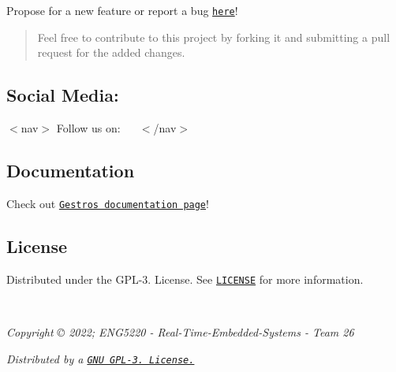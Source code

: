 Propose for a new feature or report a bug \href{https://github.com/RandomGuy-coder/Gestro/issues}{\tt here}!

\begin{quote}
Feel free to contribute to this project by forking it and submitting a pull request for the added changes. \end{quote}


\subsection*{Social Media\+:}

$<$nav$>$ Follow us on\+:~\newline
~\newline
  \href{https://www.facebook.com/GestroProject}{\tt } \href{https://twitter.com/GestroProject}{\tt } \href{https://www.instagram.com/gestroproject/}{\tt } \href{https://hackaday.io/project/184728-gestro}{\tt }  $<$/nav$>$

\subsection*{Documentation}

Check out \href{https://randomguy-coder.github.io/Gestro/docs/html/index.html}{\tt Gestro\textquotesingle{}s documentation page}!

\subsection*{License}

Distributed under the G\+P\+L-\/3. License. See \href{https://github.com/RandomGuy-coder/Gestro/blob/main/LICENSE}{\tt {\ttfamily L\+I\+C\+E\+N\+SE}} for more information.

~\newline
 
\footnotesize {\itshape Copyright \copyright{} 2022; E\+N\+G5220 -\/ Real-\/\+Time-\/\+Embedded-\/\+Systems -\/ Team 26}
\normalsize ~\newline
 
\footnotesize {\itshape Distributed by a \href{https://github.com/RandomGuy-coder/Gestro/blob/main/LICENSE}{\tt G\+NU G\+P\+L-\/3. License.} }
\normalsize 